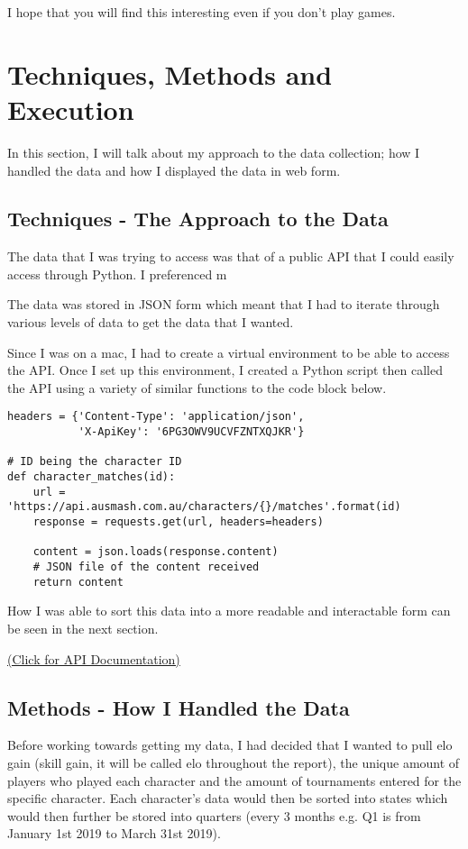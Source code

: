\documentclass[11pt, oneside, a4paper]{article}
\begin{document}
I hope that you will find this interesting even if you don't play games.

\section{Techniques, Methods and Execution}
In this section, I will talk about my approach to the data collection; how I handled the data and how I displayed the data in web form.
\subsection{Techniques - The Approach to the Data}
The data that I was trying to access was that of a public API that I could easily access through Python. I preferenced m

The data was stored in JSON form which meant that I had to iterate through various levels of data to get the data that I wanted. 

Since I was on a mac, I had to create a virtual environment to be able to access the API. Once I set up this environment, I created a Python script then called the API using a variety of similar functions to the code block below.

\begin{lstlisting}    
headers = {'Content-Type': 'application/json',
           'X-ApiKey': '6PG3OWV9UCVFZNTXQJKR'}

# ID being the character ID
def character_matches(id):
    url = 'https://api.ausmash.com.au/characters/{}/matches'.format(id)
    response = requests.get(url, headers=headers)
    
    content = json.loads(response.content)
    # JSON file of the content received
    return content

\end{lstlisting}

How I was able to sort this data into a more readable and interactable form can be seen in the next section.

\href{https://api.ausmash.com.au/swagger/ui/index#/}{(Click for API Documentation)}

\subsection{Methods - How I Handled the Data}
Before working towards getting my data, I had decided that I wanted to pull elo gain (skill gain, it will be called elo throughout the report), the unique amount of players who played each character and the amount of tournaments entered for the specific character. Each character's data would then be sorted into states which would then further be stored into quarters (every 3 months e.g. Q1 is from January 1st 2019 to March 31st 2019).
\end{document}
